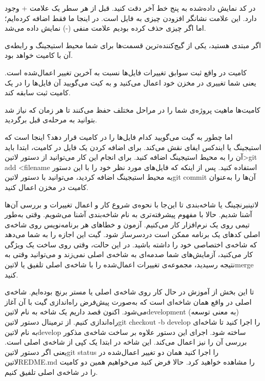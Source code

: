 در کد نمایش داده‌شده به پنج خط آخر دقت کنید. قبل از هر سطر یک علامت + وجود دارد. این علامت نشانگر افزودن چیزی به فایل است. در اینجا ما فقط اضافه کرده‌ایم؛ اما اگر چیزی حذف کرده بودیم علامت منفی (-) نمایش داده می‌شد.

اگر مبتدی هستید، یکی از گیج‌کننده‌ترین قسمت‌ها برای شما محیط استیجینگ و رابطه‌ی آن با کامیت خواهد بود.

کامیت در واقع ثبت سوابق تغییرات فایل‌ها نسبت به آخرین تغییر اعمال‌شده است. یعنی شما تغییری در مخزن خود اعمال می‌کنید و به کیت می‌گویید آن فایل‌ها را در یک کامیت ثبت سابقه کند.

کامیت‌ها ماهیت پروژه‌ی شما را در مراحل مختلف حفظ می‌کنند تا هر زمان که نیاز شد بتوانید به مرحله‌ی قبل برگردید.

اما چطور به گیت می‌گویید کدام فایل‌ها را در کامیت قرار دهد؟ اینجا است که استیجینگ یا ایندکس ایفای نقش می‌کند. برای اضافه کردن یک فایل در کامیت، ابتدا باید آن را به محیط استیجینگ اضافه کنید. برای انجام این کار می‌توانید از دستور ‌لاتین{>git add <filename} استفاده کنید. پس از اینکه که فایل‌های مورد نظر خود را با این دستور به محیط استیجینگ اضافه کردید، می‌توانید با دستور ‌لاتین{git commit} آن‌ها را به‌عنوان کامیت در مخزن اعمال کنید.

‌لاتین{برنچینگ یا شاخه‌بندی}
تا این‌جا با نحوه‌ی شروع کار و اعمال تغییرات و بررسی آن‌ها آشنا شدیم. حالا با مفهوم پیشرفته‌تری به نام شاخه‌بندی آشنا می‌شویم. وقتی به‌طور تیمی روی یک نرم‌افزار کار می‌کنیم. آزمون و خطاهای هر برنامه‌نویس روی شاخه‌ی اصلی کدهای یک برنامه ممکن است دردسرساز شود. گیت این اجازه را به شما می‌دهد که شاخه‌ی اختصاصی خود را داشته باشید. در این حالت، وقتی روی ساخت یک ویژگی کار می‌کنید، آزمایش‌های شما صدمه‌ای به شاخه‌ی اصلی نمی‌زند و می‌توانید وقتی به نتیجه رسیدید، مجموعه‌ی تغییرات اعمال‌شده را با شاخه‌ی اصلی تلفیق یا ‌لاتین{merge} کنید.

تا این‌ بخش از آموزش در حال کار روی شاخه‌ی اصلی یا مستر برنچ بوده‌ایم. شاخه‌ی اصلی در واقع همان شاخه‌ای است که به‌صورت پیش‌فرض راه‌اندازی گیت با آن آغاز می‌شود. اکنون قصد داریم یک شاخه به نام ‌لاتین{development} (به معنی توسعه) راه‌اندازی کنیم. از ترمینال دستور ‌لاتین{git checkout -b develop} را اجرا کنید تا شاخه‌ای به نام  لاتین{develop} ساخته شود. اجرای این دستور علاوه بر ساخت شاخه‌ی مذکور بررسی آن را نیز اعمال می‌کند. این شاخه در ابتدا یک کپی از شاخه‌ی اصلی است. یعنی اگر دستور ‌لاتین{git status} را اجرا کنید همان دو تغییر اعمال‌شده در ‌لاتین{REDME.md} را مشاهده خواهید کرد. حالا فرض کنید می‌خواهیم همین دو کامیت را در شاخه‌ی اصلی تلفیق کنیم.

